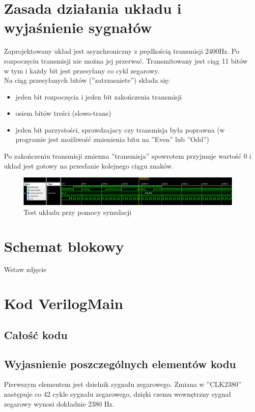 \section{Zasada działania układu i wyjaśnienie sygnałów}
Zaprojektowany układ jest asynchroniczny z prędkością transmisji $2400$Hz. Po rozpoczęciu transmisji nie można jej przerwać. Transmitowany jest ciąg 11 bitów w tym i każdy bit jest przesyłany co cykl zegarowy.\\
Na ciąg przesyłanych bitów (''zatrzasniete'') składa się:

\begin{itemize}
    \item jeden bit rozpoczęcia i jeden bit zakończenia transmisji
    \item osiem bitów treści (slowo-trans)
    \item jeden bit parzystości, sprawdzajacy czy transmisja była poprawna (w programie jest możliwość zmienienia bitu na ''Even'' lub ''Odd'')
\end{itemize}

Po zakończeniu transmisji zmienna ''transmisja'' spowrotem przyjmuje wartość $0$ i układ jest gotowy na przesłanie kolejnego ciągu znaków.

\begin{figure}[!htb]
    \centering
    \includegraphics[width=18cm]{./Images/Symulacja.png}
    \caption*{Test układu przy pomocy symulacji}
\end{figure}

\section{Schemat blokowy}
Wstaw zdjęcie

\section{Kod VerilogMain}
\subsection{Całość kodu}


\subsection{Wyjasnienie poszczególnych elementów kodu}
Pierwszym elementem jest dzielnik sygnału zegarowego. Zmiana w ''CLK2380'' następuje co 42 cykle sygnału zegarowego, dzięki czemu wewnętrzny sygnał zegarowy wynosi dokładnie 2380 Hz.


